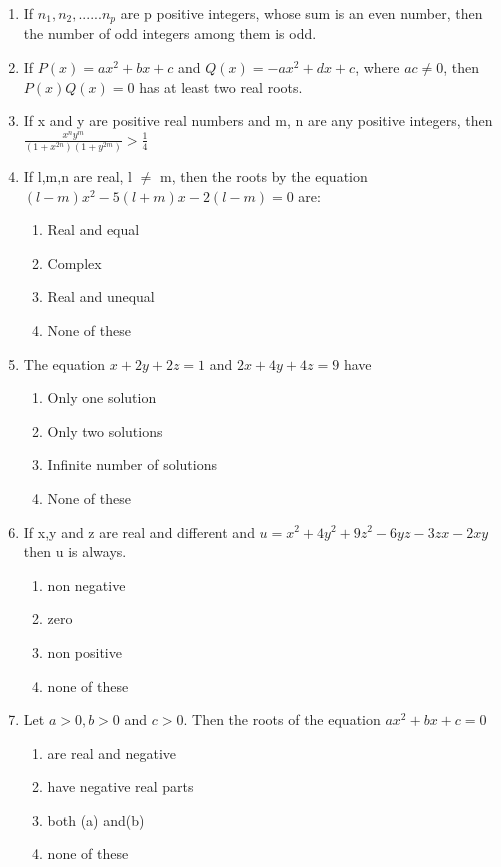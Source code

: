 \begin{enumerate}[label=\arabic*.,ref=\thesubsection.\theenumi]
\item If $n_1, n_2,......n_p$ are p positive integers, whose sum is an even number, then the number of odd integers among them is odd.

\item If $P(x)=ax^{2}+bx+c$ and $Q(x)=-ax^{2}+dx+c$, where $ac\neq0$, then $P(x)Q(x)=0$ has at least two real roots.

\item If x and y are positive real numbers and m, n are any positive integers, then $\frac{x^{n}y^{m}}{(1+x^{2n})(1+y^{2m})}>\frac{1}{4}$

\item If l,m,n are real, l $\neq$ m, then the roots by the equation $(l-m)x^{2}-5(l+m)x-2(l-m)=0$ are:
\begin{enumerate}
\item Real and equal
\item Complex
\item Real and unequal
\item None of these
\end{enumerate}
 
\item The equation $x+2y+2z=1$ and $2x+4y+4z=9$ have
\begin{enumerate}
\item Only one solution 
\item Only two solutions
\item Infinite number of solutions
\item None of these
\end{enumerate}
 
\item If x,y and z are real and different and $u=x^{2}+4y^{2}+9z^{2}-6yz-3zx-2xy$ then u is always.
\begin{enumerate}
\item non negative
\item zero
\item non positive
\item none of these
\end{enumerate}

\item Let $a>0,b>0$ and $c>0$. Then the roots of the equation $ax^{2}+bx+c=0$
\begin{enumerate}
\item are real and negative
\item have negative real parts
\item both (a) and(b)
\item none of these
\end{enumerate}


\end{enumerate}
